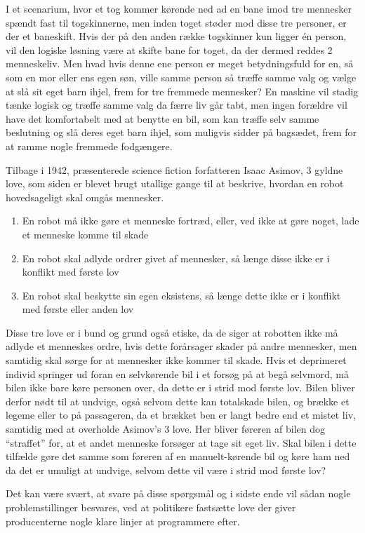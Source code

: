 	I et scenarium, hvor et tog kommer kørende ned ad en bane imod tre mennesker spændt fast til togskinnerne, men inden toget støder mod disse tre personer, er der et baneskift. Hvis der på den anden række togskinner kun ligger \'en person, vil den logiske løsning være at skifte bane for toget, da der dermed reddes 2 menneskeliv. Men hvad hvis denne ene person er meget betydningsfuld for en, så som en mor eller ens egen søn, ville samme person så træffe samme valg og vælge at slå sit eget barn ihjel, frem for tre fremmede mennesker? En maskine vil stadig tænke logisk og træffe samme valg da færre liv går tabt, men ingen forældre vil have det komfortabelt med at benytte en bil, som kan træffe selv samme beslutning og slå deres eget barn ihjel, som muligvis sidder på bagsædet, frem for at ramme nogle fremmede fodgængere.
	
	Tilbage i 1942, præsenterede science fiction forfatteren Isaac Asimov, 3 gyldne love\cite{Asimov}, som siden er blevet brugt utallige gange til at beskrive, hvordan en robot hovedsageligt skal omgås mennesker.
	
	\begin{enumerate}
		
		\item En robot må ikke gøre et menneske fortræd, eller, ved ikke at gøre noget, lade et menneske komme til skade
		\item En robot skal adlyde ordrer givet af mennesker, så længe disse ikke er i konflikt med første lov
		\item En robot skal beskytte sin egen eksistens, så længe dette ikke er i konflikt med første eller anden lov
		
	\end{enumerate}
	
	Disse tre love er i bund og grund også etiske, da de siger at robotten ikke må adlyde et menneskes ordre, hvis dette forårsager skader på andre mennesker, men samtidig skal sørge for at mennesker ikke kommer til skade. Hvis et deprimeret individ springer ud foran en selvkørende bil i et forsøg på at begå selvmord, må bilen ikke bare køre personen over, da dette er i strid mod første lov. Bilen bliver derfor nødt til at undvige, også selvom dette kan totalskade bilen, og brække et legeme eller to på passageren, da et brækket ben er langt bedre end et mistet liv, samtidig med at overholde Asimov's 3 love. Her bliver føreren af bilen dog ``straffet'' for, at et andet menneske forsøger at tage sit eget liv. Skal bilen i dette tilfælde gøre det samme som føreren af en manuelt-kørende bil og køre ham ned da det er umuligt at undvige, selvom dette vil være i strid mod første lov? 

	Det kan være svært, at svare på disse spørgsmål og i sidste ende vil sådan nogle problemstillinger besvares, ved at politikere fastsætte love der giver producenterne nogle klare linjer at programmere efter.